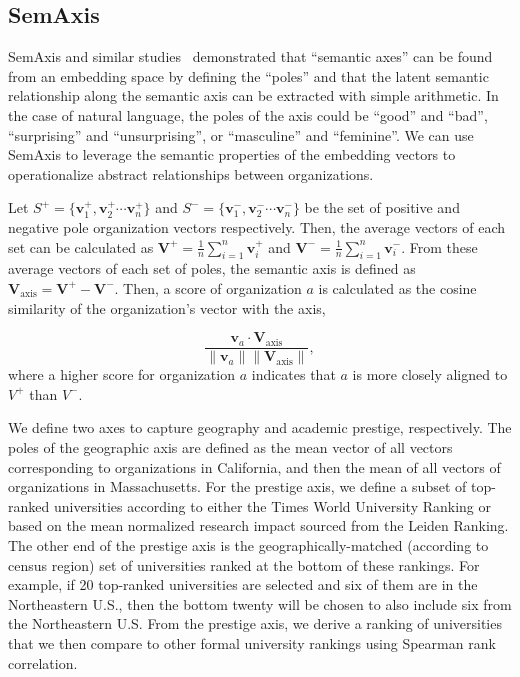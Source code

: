\documentclass[12pt]{article} %
\begin{document}
%
%
\subsection*{SemAxis}
SemAxis and similar studies~\autocite{an2018semaxis, nakandala2017gendered, kozlowski2018geometry} demonstrated that ``semantic axes'' can be found from an embedding space by defining the ``poles'' and that the latent semantic relationship along the semantic axis can be extracted with simple arithmetic.
In the case of natural language, the poles of the axis could be ``good'' and ``bad'', ``surprising'' and ``unsurprising'', or ``masculine'' and ``feminine''.
We can use SemAxis to leverage the semantic properties of the embedding vectors to operationalize abstract relationships between organizations.

Let $S^+ = \{\bm{v}_1^+, \bm{v}_2^+ \cdots \bm{v}_n^+\}$ and $S^- =\{\bm{v}_1^-, \bm{v}_2^- \cdots \bm{v}_n^-\}$ be the set of positive and negative pole organization vectors respectively.
Then, the average vectors of each set can be calculated as $\bm{V}^{+} = \frac{1}{n}\sum^n_{i=1} \bm{v}_i^+$ and $\bm{V}^{-} = \frac{1}{n}\sum^n_{i=1} \bm{v}_i^-$.
From these average vectors of each set of poles, the semantic axis is defined as $\bm{V}_{\text{axis}} = \bm{V}^{+} - \bm{V}^{-}$. Then,  a score of organization $a$ is calculated as the cosine similarity of the organization's vector with the axis,



\begin{equation}
	\frac{\bm{v}_{a} \cdot \bm{V}_{\text{axis}}}{\lVert \bm{v}_{a} \rVert \lVert \bm{V}_{\text{axis}} \rVert},
\end{equation}
where a higher score for organization $a$ indicates that $a$ is more closely aligned to $V^+$ than $V^-$.

We define two axes to capture geography and academic prestige, respectively.
The poles of the geographic axis are defined as the mean vector of all vectors corresponding to organizations in California, and then the mean of all vectors of organizations in Massachusetts.
For the prestige axis, we define a subset of top-ranked universities according to either the Times World University Ranking or based on the mean normalized research impact sourced from the Leiden Ranking.
The other end of the prestige axis is the geographically-matched (according to census region) set of universities ranked at the bottom of these rankings.
For example, if 20 top-ranked universities are selected and six of them are in the Northeastern U.S., then the bottom twenty will be chosen to also include six from the Northeastern U.S.
From the prestige axis, we derive a ranking of universities that we then compare to other formal university rankings using Spearman rank correlation.
\end{document}
